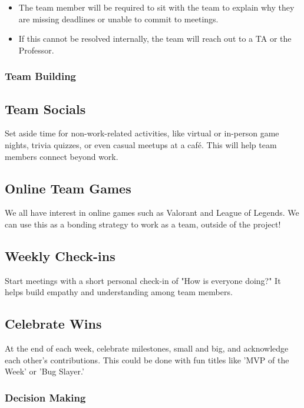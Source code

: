 \documentclass{article}
\begin{document}
\begin{itemize}
    \item The team member will be required to sit with the team to explain why they are missing deadlines or unable to commit to meetings.
    \item If this cannot be resolved internally, the team will reach out to a TA or the Professor.
\end{itemize}
\subsubsection*{Team Building}

\subsection*{Team Socials}
Set aside time for non-work-related activities, like virtual or in-person game nights, trivia quizzes, or even casual meetups at a café. This will help team members connect beyond work.

\subsection*{Online Team Games}
We all have interest in online games such as Valorant and League of Legends. We can use this as a bonding strategy to work as a team, outside of the project!

\subsection*{Weekly Check-ins}
Start meetings with a short personal check-in of "How is everyone doing?" It helps build empathy and understanding among team members.

\subsection*{Celebrate Wins}
At the end of each week, celebrate milestones, small and big, and acknowledge each other’s contributions. This could be done with fun titles like 'MVP of the Week' or 'Bug Slayer.'


\subsubsection*{Decision Making} 
\end{document}

